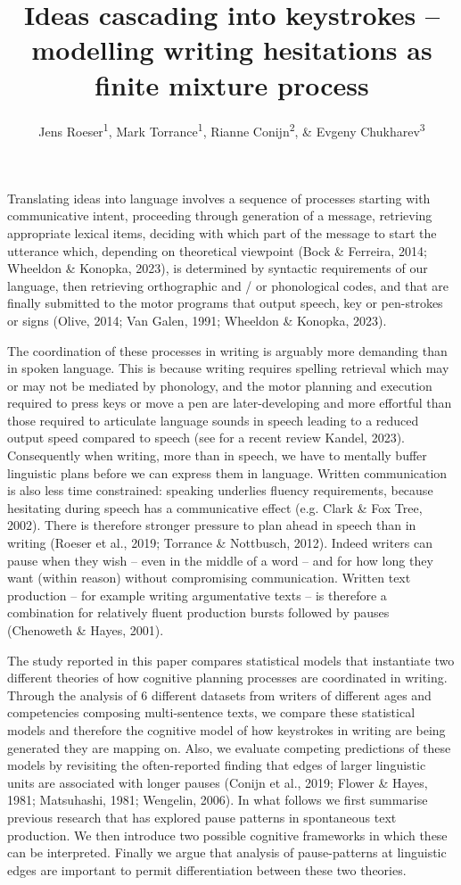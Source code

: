 \documentclass[
  man,floatsintext]{apa7}
\title{Ideas cascading into keystrokes -- modelling writing hesitations as finite mixture process}
\author{Jens Roeser\textsuperscript{1}, Mark Torrance\textsuperscript{1}, Rianne Conijn\textsuperscript{2}, \& Evgeny Chukharev\textsuperscript{3}}
\date{}
\affiliation{\vspace{0.5cm}\textsuperscript{1} Department of Psychology, Nottingham Trent University, United Kingdom\\\textsuperscript{2} Artificial Intelligence Systems Institute, Eindhoven University of Technology, The Netherlands\\\textsuperscript{3} Department of English, Iowa State University, Iowa}
\begin{document}
\maketitle

Translating ideas into language involves a sequence of processes starting with communicative intent, proceeding through generation of a message, retrieving appropriate lexical items, deciding with which part of the message to start the utterance which, depending on theoretical viewpoint (Bock \& Ferreira, 2014; Wheeldon \& Konopka, 2023), is determined by syntactic requirements of our language, then retrieving orthographic and / or phonological codes, and that are finally submitted to the motor programs that output speech, key or pen-strokes or signs (Olive, 2014; Van Galen, 1991; Wheeldon \& Konopka, 2023).

The coordination of these processes in writing is arguably more demanding than in spoken language. This is because writing requires spelling retrieval which may or may not be mediated by phonology, and the motor planning and execution required to press keys or move a pen are later-developing and more effortful than those required to articulate language sounds in speech leading to a reduced output speed compared to speech (see for a recent review Kandel, 2023). Consequently when writing, more than in speech, we have to mentally buffer linguistic plans before we can express them in language. Written communication is also less time constrained: speaking underlies fluency requirements, because hesitating during speech has a communicative effect (e.g. Clark \& Fox Tree, 2002). There is therefore stronger pressure to plan ahead in speech than in writing (Roeser et al., 2019; Torrance \& Nottbusch, 2012). Indeed writers can pause when they wish -- even in the middle of a word -- and for how long they want (within reason) without compromising communication. Written text production -- for example writing argumentative texts -- is therefore a combination for relatively fluent production bursts followed by pauses (Chenoweth \& Hayes, 2001).

The study reported in this paper compares statistical models that instantiate two different theories of how cognitive planning processes are coordinated in writing. Through the analysis of 6 different datasets from writers of different ages and competencies composing multi-sentence texts, we compare these statistical models and therefore the cognitive model of how keystrokes in writing are being generated they are mapping on. Also, we evaluate competing predictions of these models by revisiting the often-reported finding that edges of larger linguistic units are associated with longer pauses (Conijn et al., 2019; Flower \& Hayes, 1981; Matsuhashi, 1981; Wengelin, 2006). In what follows we first summarise previous research that has explored pause patterns in spontaneous text production. We then introduce two possible cognitive frameworks in which these can be interpreted. Finally we argue that analysis of pause-patterns at linguistic edges are important to permit differentiation between these two theories.
\end{document}
